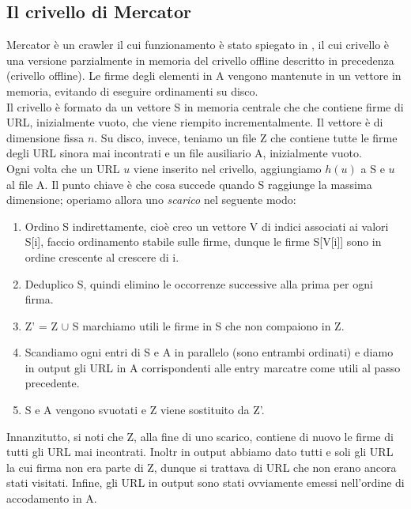 \subsection{Il crivello di Mercator}
Mercator è un crawler il cui funzionamento è stato spiegato in \cite{Mercator}, il cui crivello è una versione parzialmente in memoria del crivello offline descritto in precedenza (crivello offline). Le firme degli elementi in A vengono mantenute in un vettore in memoria, evitando di eseguire ordinamenti su disco.\\
Il crivello è formato da un vettore S in memoria centrale che che contiene firme di URL, inizialmente vuoto, che viene riempito incrementalmente. Il vettore è di dimensione fissa $n$. Su disco, invece, teniamo un file Z che contiene tutte le firme degli URL sinora mai incontrati e un file ausiliario A, inizialmente vuoto.\\
Ogni volta che un URL $u$ viene inserito nel crivello, aggiungiamo $h(u)$ a S e $u$ al file A. Il punto chiave è che cosa succede quando S raggiunge la massima dimensione; operiamo allora uno \textit{scarico} nel seguente modo:
\begin{enumerate}
    \item Ordino S indirettamente, cioè creo un vettore V di indici associati ai valori S[i], faccio ordinamento stabile sulle firme, dunque le firme S[V[i]] sono in ordine crescente al crescere di i.
    \item Deduplico S, quindi elimino le occorrenze successive alla prima per ogni firma.
    \item Z' = Z $\cup$ S marchiamo utili le firme in S che non compaiono in Z.
    \item Scandiamo ogni entri di S e A in parallelo (sono entrambi ordinati) e diamo in output gli URL in A corrispondenti alle entry marcatre come utili al passo precedente.
    \item S e A vengono svuotati e Z viene sostituito da Z'. 
\end{enumerate}
Innanzitutto, si noti che Z, alla fine di uno scarico, contiene di nuovo le firme di tutti gli URL mai incontrati. Inoltr in output abbiamo dato tutti e soli gli URL la cui firma non era parte di Z, dunque si trattava di URL che non erano ancora stati visitati. Infine, gli URL in output sono stati ovviamente emessi nell'ordine di accodamento in A.

